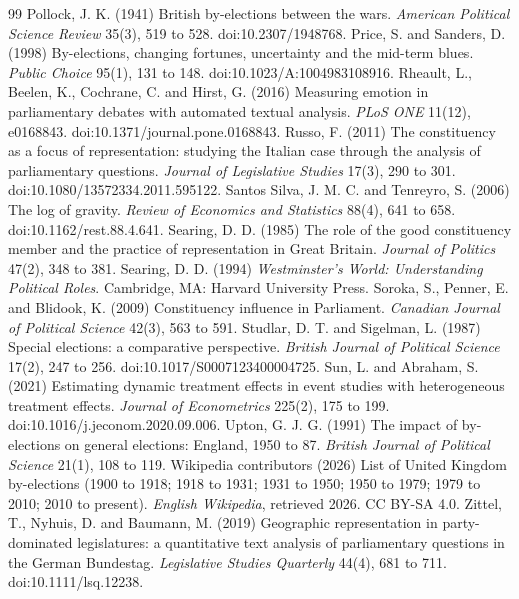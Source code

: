 \documentclass[11pt,a4paper]{article}
\begin{document}
\begin{thebibliography}{99}
 Pollock, J. K. (1941) British by-elections between the wars. \textit{American Political Science Review} 35(3), 519 to 528. doi:10.2307/1948768.
 Price, S. and Sanders, D. (1998) By-elections, changing fortunes, uncertainty and the mid-term blues. \textit{Public Choice} 95(1), 131 to 148. doi:10.1023/A:1004983108916.
 Rheault, L., Beelen, K., Cochrane, C. and Hirst, G. (2016) Measuring emotion in parliamentary debates with automated textual analysis. \textit{PLoS ONE} 11(12), e0168843. doi:10.1371/journal.pone.0168843.
 Russo, F. (2011) The constituency as a focus of representation: studying the Italian case through the analysis of parliamentary questions. \textit{Journal of Legislative Studies} 17(3), 290 to 301. doi:10.1080/13572334.2011.595122.
 Santos Silva, J. M. C. and Tenreyro, S. (2006) The log of gravity. \textit{Review of Economics and Statistics} 88(4), 641 to 658. doi:10.1162/rest.88.4.641.
 Searing, D. D. (1985) The role of the good constituency member and the practice of representation in Great Britain. \textit{Journal of Politics} 47(2), 348 to 381.
 Searing, D. D. (1994) \textit{Westminster's World: Understanding Political Roles}. Cambridge, MA: Harvard University Press.
 Soroka, S., Penner, E. and Blidook, K. (2009) Constituency influence in Parliament. \textit{Canadian Journal of Political Science} 42(3), 563 to 591.
 Studlar, D. T. and Sigelman, L. (1987) Special elections: a comparative perspective. \textit{British Journal of Political Science} 17(2), 247 to 256. doi:10.1017/S0007123400004725.
 Sun, L. and Abraham, S. (2021) Estimating dynamic treatment effects in event studies with heterogeneous treatment effects. \textit{Journal of Econometrics} 225(2), 175 to 199. doi:10.1016/j.jeconom.2020.09.006.
 Upton, G. J. G. (1991) The impact of by-elections on general elections: England, 1950 to 87. \textit{British Journal of Political Science} 21(1), 108 to 119.
 Wikipedia contributors (2026) List of United Kingdom by-elections (1900 to 1918; 1918 to 1931; 1931 to 1950; 1950 to 1979; 1979 to 2010; 2010 to present). \textit{English Wikipedia}, retrieved 2026. CC BY-SA 4.0.
 Zittel, T., Nyhuis, D. and Baumann, M. (2019) Geographic representation in party-dominated legislatures: a quantitative text analysis of parliamentary questions in the German Bundestag. \textit{Legislative Studies Quarterly} 44(4), 681 to 711. doi:10.1111/lsq.12238.
\end{thebibliography}
\end{document}
